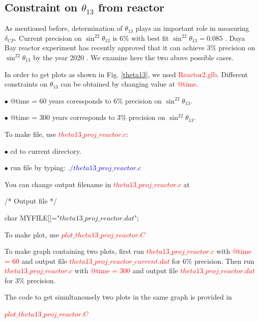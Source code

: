 \documentclass[a4 paper,12pt]{report}%
\begin{document}
\subsection{Constraint on $\theta_{13}$ from reactor}
As mentioned before, determination of $\theta_{13}$ plays an important role in measuring $\delta_{CP}$. Current precision on $\sin^22\theta_{13}$ is $6\%$ \cite{An:2015rpe} with best fit $\sin^22\theta_{13} = 0.085$ \cite{Agashe:2014kda}. Daya Bay reactor experiment has recently approved that it can achieve $3\%$ precision on $\sin^22\theta_{13}$ by the year 2020 \cite{Cao:2016vwh}. We examine here the two above possible cases. \par 
In order to get plots as shown in Fig. \ref{theta13}, we used \textcolor{red}{Reactor2.glb}. Different constraints on $\theta_{13}$ can be obtained by changing value at \textcolor{red}{@time}.\par 
$\bullet$ @time = 60 years coressponds to $6\%$ precision on $\sin^22\theta_{13}$.\par 
$\bullet$ @time = 300 years corresponds to $3\%$ precision on $\sin^22\theta_{13}$.\par 
To make file, use \textcolor{red}{$theta13\_proj\_reactor.c$}:\par 
$\bullet$ cd to current directory.\par 
$\bullet$ run file by typing: \textcolor{blue}{$./theta13\_proj\_reactor.c$}\par 
You can change output filename in \textcolor{red}{$theta13\_proj\_reactor.c$} at\par 
\begin{center}
/* Output file */ \par 
 char MYFILE[]="$theta13\_proj\_reactor.dat$";
\end{center}\par 
To make plot, use \textcolor{red}{$plot\_theta13\_proj\_reactor.C$}\par 
To make graph containing two plots, first run \textcolor{red}{$theta13\_proj\_reactor.c$} with \textcolor{red}{@time = 60} and output file \textcolor{red}{$theta13\_proj\_reactor\_current.dat$} for $6\%$ precision. Then run \textcolor{red}{$theta13\_proj\_reactor.c$} with \textcolor{red}{@time = 300} and output file \textcolor{red}{$theta13\_proj\_reactor.dat$} for $3\%$ precision.\par 
The code to get simultanousely two plots in the same graph is provided in \par 
 \textcolor{red}{$plot\_theta13\_proj\_reactor.C$}\par
\end{document}
